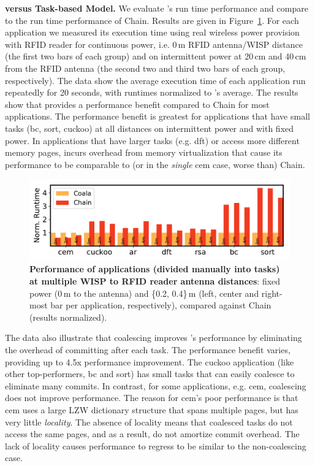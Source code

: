 \textbf{\sys versus Task-based Model.} We evaluate \sys's run time performance and compare \sys to the run time performance of Chain. Results are given in Figure~\ref{fig:runtime}. For each application we measured its execution time using real wireless power provision with RFID reader for continuous power, i.e. 0\,m RFID antenna/WISP distance (the first two bars of each group) and on intermittent power at 20\,cm and 40\,cm from the RFID antenna (the second two and third two bars of each group, respectively). The data show the average execution time of each application run repeatedly for 20 seconds, with runtimes normalized to \sys's average. The results show that \sys provides a performance benefit compared to Chain for most applications. The performance benefit is greatest for applications that have small tasks (bc, sort, cuckoo) at all distances on intermittent power and with fixed power. In applications that have larger tasks (e.g. dft) or access more different memory pages, \sys incurs overhead from memory virtualization that cause its performance to be comparable to (or in the \emph{single} cem case, worse than) Chain. 

\begin{figure}
	\centering
	\includegraphics[width=\columnwidth]{figures/coala_chain_clang}
	\caption{\textbf{Performance of \sys applications (divided manually into tasks) at multiple WISP to RFID reader antenna distances}: fixed power (0\,m to the antenna) and \{0.2, 0.4\}\,m (left, center and right-most bar per application, respectively), compared against Chain (results normalized).}
	\label{fig:runtime}
\end{figure}

The data also illustrate that coalescing improves \sys's performance by eliminating the overhead of committing after each task. The performance benefit varies, providing up to 4.5x performance improvement. The cuckoo application (like other top-performers, bc and sort) has small tasks that \sys can easily coalesce to eliminate many commits. In contrast, for some applications, e.g. cem, coalescing does not improve performance. The reason for cem's poor performance is that cem uses a large LZW dictionary structure that spans multiple pages, but has very little {\em locality}. The absence of locality means that coalesced tasks do not access the same pages, and as a result, do not amortize commit overhead. The lack of locality causes performance to regress to be similar to the non-coalescing case. 

